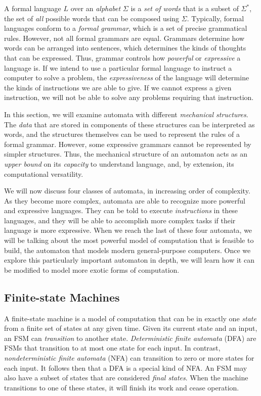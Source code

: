 A formal language $L$ over an \textit{alphabet} $\Sigma$ is a \textit{set of words} that is a subset of $\Sigma^*$, the set of \textit{all} possible words that can be composed using $\Sigma$. Typically, formal languages conform to a \textit{formal grammar}, which is a set of precise grammatical rules. However, not all formal grammars are equal. Grammars determine how words can be arranged into sentences, which determines the kinds of thoughts that can be expressed. Thus, grammar controls how \textit{powerful} or \textit{expressive} a language is. If we intend to use a particular formal language to instruct a computer to solve a problem, the \textit{expressiveness} of the language will determine the kinds of instructions we are able to give. If we cannot express a given instruction, we will not be able to solve any problems requiring that instruction.

In this section, we will examine automata with different \textit{mechanical structures}. The \textit{data} that are stored in components of these structures can be interpreted as words, and the structures themselves can be used to represent the rules of a formal grammar. However, some expressive grammars cannot be represented by simpler structures. Thus, the mechanical structure of an automaton acts as an \textit{upper bound} on its \textit{capacity} to understand language, and, by extension, its computational versatility.

We will now discuss four classes of automata, in increasing order of complexity. As they become more complex, automata are able to recognize more powerful and expressive languages. They can be told to execute \textit{instructions} in these languages, and they will be able to accomplish more complex tasks if their language is more expressive. When we reach the last of these four automata, we will be talking about the most powerful model of computation that is feasible to build, the automaton that models modern general-purpose computers. Once we explore this particularly important automaton in depth, we will learn how it can be modified to model more exotic forms of computation.

\subsection{Finite-state Machines}

A finite-state machine is a model of computation that can be in exactly one \textit{state} from a finite set of states at any given time. Given its current state and an input, an FSM can \textit{transition} to another state. \textit{Deterministic finite automata} (DFA) are FSMs that transition to at most one state for each input. In contrast, \textit{nondeterministic finite automata} (NFA) can transition to zero or more states for each input. It follows then that a DFA is a special kind of NFA. An FSM may also have a subset of states that are considered \textit{final states}. When the machine transitions to one of these states, it will finish its work and cease operation.

